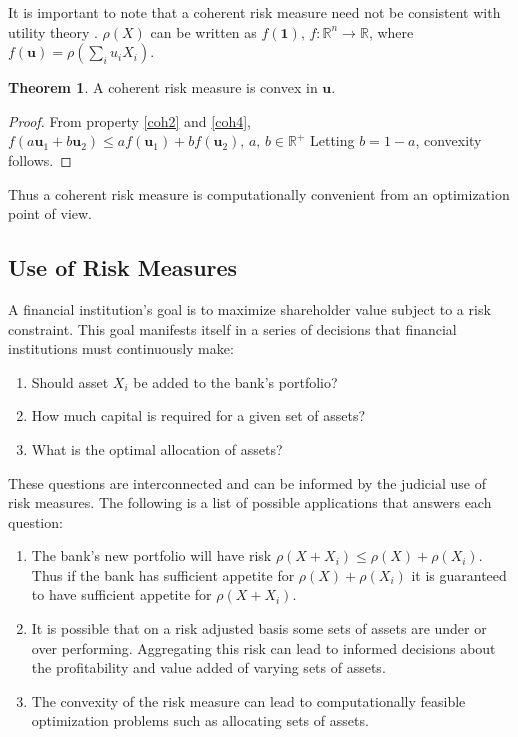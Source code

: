 \documentclass[12pt]{article}
\theoremstyle{definition}
\newtheorem{theorem}{Theorem}
\begin{document}
It is important to note that a coherent risk measure need not be consistent with utility theory \cite{tsanakas2003}.  \(\rho(X)\) can be written as \(f(\mathbf{1}),\, f:\mathbb{R}^n \to \mathbb{R}\), where \(f(\mathbf{u})=\rho\left(\sum_i u_i X_i\right)\).

\begin{theorem}  A coherent risk measure is convex in \(\mathbf{u}\). 
\end{theorem}

\begin{proof}

 From property \ref{coh2} and \ref{coh4},  \(f(a \mathbf{u}_1+b\mathbf{u}_2)\leq a f(\mathbf{u}_1)+bf(\mathbf{u}_2),\,a,\,b \in \mathbb{R}^+\)
Letting \(b=1-a\), convexity follows.

\end{proof}

Thus a coherent risk measure is computationally convenient from an optimization point of view.

\subsection{Use of Risk Measures}

A financial institution's goal is to maximize shareholder value subject to a risk constraint.  This goal manifests itself in a series of decisions that financial institutions must continuously make:

\begin{enumerate}
\item Should asset \(X_i\) be added to the bank's portfolio?
\item How much capital is required for a given set of assets?
\item What is the optimal allocation of assets?
\end{enumerate}

These questions are interconnected and can be informed by the judicial use of risk measures.  The following is a list of possible applications that answers each question:
\begin{enumerate}
\item The bank's new portfolio will have risk \(\rho(X+X_i)\leq \rho(X)+\rho(X_i)\).  Thus if the bank has sufficient appetite for \(\rho(X)+\rho(X_i)\) it is guaranteed to have sufficient appetite for \(\rho(X+X_i)\).
\item It is possible that on a risk adjusted basis some sets of assets are under or over performing.  Aggregating this risk can lead to informed decisions about the profitability and value added of varying sets of assets.  
\item The convexity of the risk measure can lead to computationally feasible optimization problems such as allocating sets of assets.  
\end{enumerate}
\end{document}

